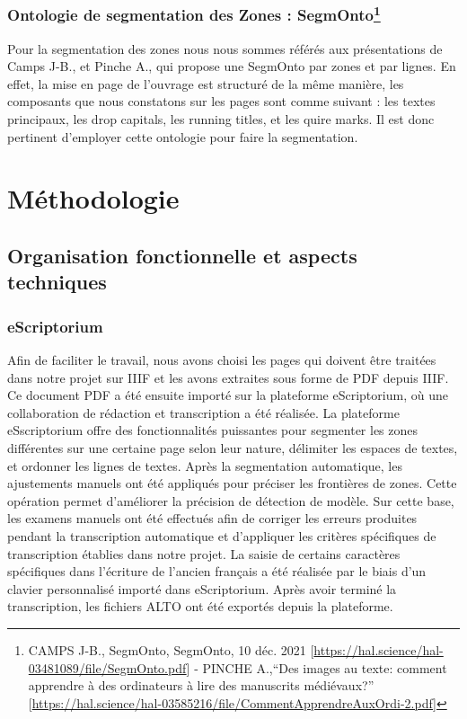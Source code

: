 \documentclass[12pt]{article}
\begin{document}
\subsubsection{Ontologie de segmentation des Zones : SegmOnto\footnote{CAMPS J-B., SegmOnto, SegmOnto, 10 déc. 2021 [\href{https://hal.science/hal-03481089/file/SegmOnto.pdf}{https://hal.science/hal-03481089/file/SegmOnto.pdf}] - PINCHE A.,“Des images au texte: comment apprendre à des ordinateurs à lire des manuscrits médiévaux?” 
[\href{https://hal.science/hal-03585216/file/CommentApprendreAuxOrdi-2.pdf}{https://hal.science/hal-03585216/file/CommentApprendreAuxOrdi-2.pdf}]}}
Pour la segmentation des zones nous nous sommes référés aux présentations de Camps J-B., et Pinche A., qui propose une SegmOnto par zones et par lignes. En effet, la mise en page de l’ouvrage est structuré de la même manière, les composants que nous constatons sur les pages sont comme suivant : les textes principaux, les drop capitals, les running titles, et les quire marks. Il est donc pertinent d’employer cette ontologie pour faire la segmentation.

\section{Méthodologie}

\subsection{Organisation fonctionnelle et aspects techniques}

\subsubsection{eScriptorium}
Afin de faciliter le travail, nous avons choisi les pages qui doivent être traitées dans notre projet sur IIIF et les avons extraites sous forme de PDF depuis IIIF. Ce document PDF a été ensuite importé sur la plateforme eScriptorium, où une collaboration de rédaction et transcription a été réalisée.
La plateforme eSscriptorium offre des fonctionnalités puissantes pour segmenter les zones différentes sur une certaine page selon leur nature, délimiter les espaces de textes, et ordonner les lignes de textes. Après la segmentation automatique, les ajustements manuels ont été appliqués pour préciser les frontières de zones. Cette opération permet d’améliorer la précision de détection de modèle. Sur cette base, les examens manuels ont été effectués afin de corriger les erreurs produites pendant la transcription automatique et d’appliquer les critères spécifiques de transcription établies dans notre projet. La saisie de certains caractères spécifiques dans l’écriture de l’ancien français a été réalisée par le biais d’un clavier personnalisé importé dans eScriptorium. Après avoir terminé la transcription, les fichiers ALTO ont été exportés depuis la plateforme. 
\end{document}

